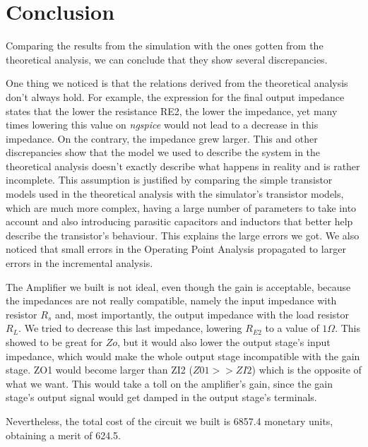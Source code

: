\section{Conclusion}
\label{sec:conclusion}

Comparing the results from the simulation with the ones gotten from the theoretical analysis, we can conclude that they show several discrepancies.

One thing we noticed is that the relations derived from the theoretical analysis don't always hold. For example, the expression for the final output impedance states that the lower the resistance RE2, the lower the impedance, yet many times lowering this value on \textit{ngspice} would not lead
to a decrease in this impedance. On the contrary, the impedance grew larger. This and other discrepancies show that the model we used to describe the system in the theoretical analysis doesn't exactly describe what happens in reality and is rather incomplete. This assumption is justified by comparing
the simple transistor models used in the theoretical analysis with the simulator's transistor models, which are much more complex, having a large number of parameters to take into account and also introducing parasitic capacitors and inductors that better help describe the transistor's behaviour.
This explains the large errors we got. We also noticed that small errors in the Operating Point Analysis propagated to larger errors in the incremental analysis.
\par
The Amplifier we built is not ideal, even though the gain is acceptable, because the impedances are not really compatible, namely the input impedance with resistor $R_s$ and, most importantly, the output impedance with the load resistor $R_L$. We tried to decrease this last impedance, lowering
$R_{E2}$ to a value of $1\Omega$. This showed to be great for $Zo$, but it would also lower the output stage's input impedance, which would make the whole output stage incompatible with the gain stage. ZO1 would become larger than ZI2 ($Z01>>ZI2$) which is the opposite of what we want. This would take a toll on the
amplifier's gain, since the gain stage's output signal would get damped in the output stage's terminals. \par

Nevertheless, the total cost of the circuit we built is 6857.4 monetary units, obtaining a merit of 624.5.
